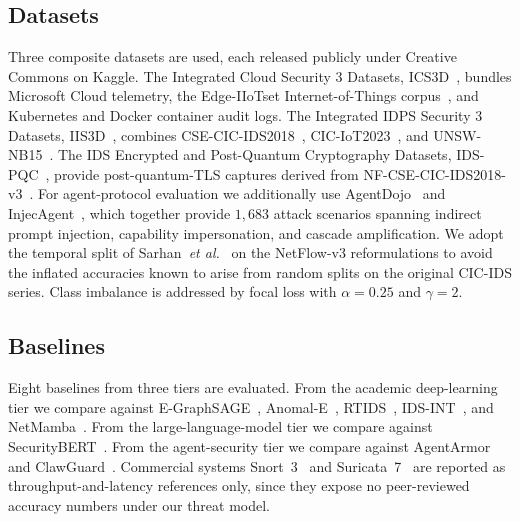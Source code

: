\documentclass[journal,10pt,twocolumn]{IEEEtran}
\begin{document}
\subsection{Datasets}
\label{sec:datasets}
Three composite datasets are used, each released publicly under Creative Commons on Kaggle. The Integrated Cloud Security 3 Datasets, ICS3D~\cite{Anonymous2025ICS3D}, bundles Microsoft Cloud telemetry, the Edge-IIoTset Internet-of-Things corpus~\cite{Ferrag2022EdgeIIoT}, and Kubernetes and Docker container audit logs. The Integrated IDPS Security 3 Datasets, IIS3D~\cite{Anonymous2025IIS3D}, combines CSE-CIC-IDS2018~\cite{Sharafaldin2018CICIDS}, CIC-IoT2023~\cite{Neto2023CICIoT}, and UNSW-NB15~\cite{Moustafa2015UNSW}. The IDS Encrypted and Post-Quantum Cryptography Datasets, IDS-PQC~\cite{Anonymous2025PQC}, provide post-quantum-TLS captures derived from NF-CSE-CIC-IDS2018-v3~\cite{Sarhan2021NetFlow}. For agent-protocol evaluation we additionally use AgentDojo~\cite{Debenedetti2024AgentDojo} and InjecAgent~\cite{Zhan2024InjecAgent}, which together provide $1{,}683$ attack scenarios spanning indirect prompt injection, capability impersonation, and cascade amplification. We adopt the temporal split of Sarhan~\textit{et al.}~\cite{Sarhan2021NetFlow} on the NetFlow-v3 reformulations to avoid the inflated accuracies known to arise from random splits on the original CIC-IDS series. Class imbalance is addressed by focal loss with $\alpha=0.25$ and $\gamma=2$.

\subsection{Baselines}
\label{sec:baselines}
Eight baselines from three tiers are evaluated. From the academic deep-learning tier we compare against E-GraphSAGE~\cite{Lo2022EGraphSAGE}, Anomal-E~\cite{Caville2022AnomalE}, RTIDS~\cite{Wu2022RTIDS}, IDS-INT~\cite{Ullah2024IDSINT}, and NetMamba~\cite{Wang2025NetMamba}. From the large-language-model tier we compare against SecurityBERT~\cite{Ferrag2024SecurityBERT}. From the agent-security tier we compare against AgentArmor~\cite{Wang2025AgentArmor} and ClawGuard~\cite{Zhao2026ClawGuard}. Commercial systems Snort~3~\cite{Cisco2025Snort3} and Suricata~7~\cite{OISF2025Suricata} are reported as throughput-and-latency references only, since they expose no peer-reviewed accuracy numbers under our threat model.
\end{document}
